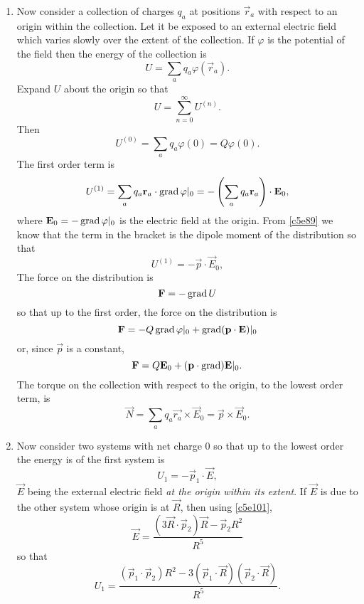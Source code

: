 \begin{enumerate}
\item Now consider a collection of charges $q_a$ at positions $\vec{r}_a$ with 
respect to an origin within the collection. Let it be exposed to an external 
electric field which varies slowly over the extent of the collection. If $\varphi$
is the potential of the field then the energy of the collection is
\begin{equation}\label{c5e117}
U = \sum_aq_a\varphi(\vec{r}_a).
\end{equation}
Expand $U$ about the origin so that
\begin{equation}\label{c5e118}
U = \sum_{n=0}^\infty U^{(n)}.
\end{equation}
Then 
\begin{equation}\label{c5e119}
U^{(0)} = \sum_a q_a\varphi(0) = Q\varphi(0).
\end{equation}
The first order term is
\[
U^{(1)} = \sum_a q_a\mathbf{r}_a\cdot\operatorname{grad}\varphi|_0 = 
-\left(\sum_a q_a\mathbf{r}_a\right)\cdot\mathbf{E}_0,
\]
where $\mathbf{E}_0 = -\operatorname{grad}\varphi|_0$ is the electric field at the origin. From 
\eqref{c5e89} we know that the term in the bracket is the dipole moment of the
distribution so that
\begin{equation}\label{c5e120}
U^{(1)} = -\vec{p}\cdot\vec{E}_0,
\end{equation}
The force on the distribution is
\begin{equation}\label{c5e121}
\mathbf{F} = -\operatorname{grad} U
\end{equation}
so that up to the first order, the force on the distribution is
\[
\mathbf{F} = -Q\operatorname{grad}\varphi|_0 + \operatorname{grad}(\mathbf{p}\cdot\mathbf{E})|_0
\]
or, since $\vec{p}$ is a constant,
\begin{equation}\label{c5e122}
\mathbf{F} = Q\mathbf{E}_0 + (\mathbf{p}\cdot\operatorname{grad})\mathbf{E}|_0.
\end{equation}
The torque on the collection with respect to the origin, to the lowest order term,
is
\begin{equation}\label{c5e123}
\vec{N} = \sum_aq_a\vec{r_a}\times\vec{E}_0  = \vec{p}\times\vec{E}_0.
\end{equation}

\item Now consider two systems with net charge $0$ so that up to the lowest order
the energy is of the first system is
\begin{equation}\label{c5e124}
U_1 = -\vec{p}_1\cdot\vec{E},
\end{equation}
$\vec{E}$ being the external electric field \emph{at the origin within its extent}.
If $\vec{E}$ is due to the other system whose origin is at $\vec{R}$, then using
\eqref{c5e101},
\[
\vec{E} = \frac{(3\vec{R}\cdot\vec{p}_2)\vec{R} - \vec{p}_2R^2}{R^5}
\]
so that
\begin{equation}\label{c5e125}
U_1 = \frac{(\vec{p}_1\cdot\vec{p}_2)R^2 - 3(\vec{p}_1\cdot\vec{R})(\vec{p}_2\cdot\vec{R})}{R^5}.
\end{equation}


\end{enumerate}
